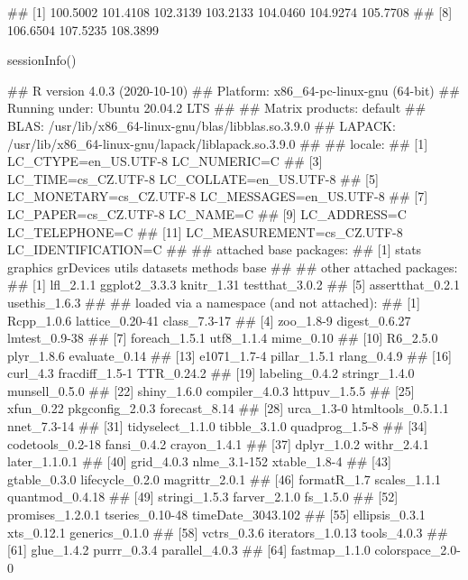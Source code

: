 \documentclass{article}\usepackage[]{graphicx}\usepackage[]{color}
\begin{document}
\begin{Schunk}
% --begin: "frbe"
\begin{Soutput}
##  [1] 100.5002 101.4108 102.3139 103.2133 104.0460 104.9274 105.7708
##  [8] 106.6504 107.5235 108.3899
\end{Soutput}
%
% --end: "frbe"
\end{Schunk}

\begin{Schunk}
\begin{Sinput}
sessionInfo()
\end{Sinput}
\begin{Soutput}
## R version 4.0.3 (2020-10-10)
## Platform: x86_64-pc-linux-gnu (64-bit)
## Running under: Ubuntu 20.04.2 LTS
## 
## Matrix products: default
## BLAS:   /usr/lib/x86_64-linux-gnu/blas/libblas.so.3.9.0
## LAPACK: /usr/lib/x86_64-linux-gnu/lapack/liblapack.so.3.9.0
## 
## locale:
##  [1] LC_CTYPE=en_US.UTF-8       LC_NUMERIC=C              
##  [3] LC_TIME=cs_CZ.UTF-8        LC_COLLATE=en_US.UTF-8    
##  [5] LC_MONETARY=cs_CZ.UTF-8    LC_MESSAGES=en_US.UTF-8   
##  [7] LC_PAPER=cs_CZ.UTF-8       LC_NAME=C                 
##  [9] LC_ADDRESS=C               LC_TELEPHONE=C            
## [11] LC_MEASUREMENT=cs_CZ.UTF-8 LC_IDENTIFICATION=C       
## 
## attached base packages:
## [1] stats     graphics  grDevices utils     datasets  methods   base     
## 
## other attached packages:
## [1] lfl_2.1.1        ggplot2_3.3.3    knitr_1.31       testthat_3.0.2  
## [5] assertthat_0.2.1 usethis_1.6.3   
## 
## loaded via a namespace (and not attached):
##  [1] Rcpp_1.0.6        lattice_0.20-41   class_7.3-17     
##  [4] zoo_1.8-9         digest_0.6.27     lmtest_0.9-38    
##  [7] foreach_1.5.1     utf8_1.1.4        mime_0.10        
## [10] R6_2.5.0          plyr_1.8.6        evaluate_0.14    
## [13] e1071_1.7-4       pillar_1.5.1      rlang_0.4.9      
## [16] curl_4.3          fracdiff_1.5-1    TTR_0.24.2       
## [19] labeling_0.4.2    stringr_1.4.0     munsell_0.5.0    
## [22] shiny_1.6.0       compiler_4.0.3    httpuv_1.5.5     
## [25] xfun_0.22         pkgconfig_2.0.3   forecast_8.14    
## [28] urca_1.3-0        htmltools_0.5.1.1 nnet_7.3-14      
## [31] tidyselect_1.1.0  tibble_3.1.0      quadprog_1.5-8   
## [34] codetools_0.2-18  fansi_0.4.2       crayon_1.4.1     
## [37] dplyr_1.0.2       withr_2.4.1       later_1.1.0.1    
## [40] grid_4.0.3        nlme_3.1-152      xtable_1.8-4     
## [43] gtable_0.3.0      lifecycle_0.2.0   magrittr_2.0.1   
## [46] formatR_1.7       scales_1.1.1      quantmod_0.4.18  
## [49] stringi_1.5.3     farver_2.1.0      fs_1.5.0         
## [52] promises_1.2.0.1  tseries_0.10-48   timeDate_3043.102
## [55] ellipsis_0.3.1    xts_0.12.1        generics_0.1.0   
## [58] vctrs_0.3.6       iterators_1.0.13  tools_4.0.3      
## [61] glue_1.4.2        purrr_0.3.4       parallel_4.0.3   
## [64] fastmap_1.1.0     colorspace_2.0-0
\end{Soutput}
\end{Schunk}
\end{document}
